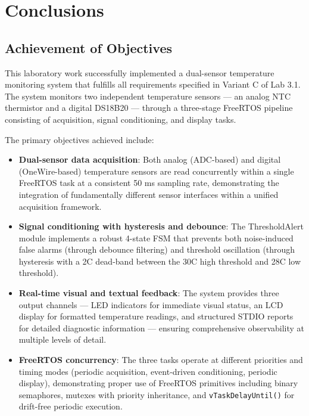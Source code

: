 \section{Conclusions}

\subsection{Achievement of Objectives}

This laboratory work successfully implemented a dual-sensor temperature monitoring system that fulfills all requirements specified in Variant C of Lab 3.1. The system monitors two independent temperature sensors --- an analog NTC thermistor and a digital DS18B20 --- through a three-stage FreeRTOS pipeline consisting of acquisition, signal conditioning, and display tasks.

The primary objectives achieved include:
\begin{itemize}
    \item \textbf{Dual-sensor data acquisition}: Both analog (ADC-based) and digital (OneWire-based) temperature sensors are read concurrently within a single FreeRTOS task at a consistent 50 ms sampling rate, demonstrating the integration of fundamentally different sensor interfaces within a unified acquisition framework.
    \item \textbf{Signal conditioning with hysteresis and debounce}: The ThresholdAlert module implements a robust 4-state FSM that prevents both noise-induced false alarms (through debounce filtering) and threshold oscillation (through hysteresis with a 2\textdegree C dead-band between the 30\textdegree C high threshold and 28\textdegree C low threshold).
    \item \textbf{Real-time visual and textual feedback}: The system provides three output channels --- LED indicators for immediate visual status, an LCD display for formatted temperature readings, and structured STDIO reports for detailed diagnostic information --- ensuring comprehensive observability at multiple levels of detail.
    \item \textbf{FreeRTOS concurrency}: The three tasks operate at different priorities and timing modes (periodic acquisition, event-driven conditioning, periodic display), demonstrating proper use of FreeRTOS primitives including binary semaphores, mutexes with priority inheritance, and \texttt{vTaskDelayUntil()} for drift-free periodic execution.
\end{itemize}

